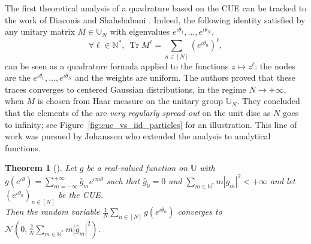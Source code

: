 \documentclass[twoside,11pt]{book}
\newtheorem{theorem}{Theorem}
\numberwithin{theorem}{chapter}
\numberwithin{definition}{chapter}
\numberwithin{proposition}{chapter}
\numberwithin{corollary}{chapter}
\numberwithin{example}{chapter}
\numberwithin{lemma}{chapter}
\DeclareMathOperator{\Tr}{Tr}
\DeclareMathOperator{\Det}{Det}
\begin{document}


The first theoretical analysis of a  quadrature based on the CUE can be tracked to the work of Diaconis and Shahshahani \citep{DiSh94}. Indeed, the following identity satisfied by any unitary matrix $M \in \mathbb{U}_{N}$ with eigenvalues $e^{\iota \theta_{1}}, \dots, e^{\iota \theta_{N}}$,
\begin{equation}
\forall \ell \in \mathbb{N}^{*}, \: \Tr M^{\ell}  = \sum\limits_{n \in [N]} (e^{\iota \theta_{n}})^{\ell},
\end{equation}
can be seen as a quadrature formula applied to the functions $z \mapsto z^{\ell}$: the nodes are the $e^{\iota \theta_{1}}, \dots, e^{\iota \theta_{N}}$ and the weights are uniform.
  The authors proved that these traces converges to centered Gaussian distributions, in the regime $N \rightarrow +\infty$, when $M$ is chosen from Haar measure on the unitary group $\mathbb{U}_{N}$. They concluded that the elements of the are \emph{very regularly spread out} on the unit disc as $N$ goes to infinity; see Figure~\ref{fig:cue_vs_iid_particles} for an illustration. This line of work was pursued by Johansson who extended the analysis to analytical functions.


\begin{theorem}[\cite{Joh97}]
Let $g$ be a real-valued function on $\mathbb{U}$ with $g(e^{\iota \theta}) = \sum\limits_{m =-\infty}^{+\infty} \hat{g}_{m}e^{\iota m \theta}$
 such that $\hat{g}_{0} = 0$ and $\displaystyle \sum\limits_{m \in \mathbb{N}^{*}} m|\hat{g}_{m}|^{2} <+\infty$ and let $(e^{\iota \theta_{n}})_{n \in [N]}$ be the CUE. \\
 Then the random variable $\displaystyle \frac{1}{N}\sum\limits_{n \in [N]} g(e^{\iota\theta_{n}})$
converges to $\displaystyle \mathcal{N}(0,\frac{2}{N}\sum\limits_{m \in \mathbb{N}^{*}} m|\hat{g}_{m}|^{2})$.
\end{theorem}


\end{document}
